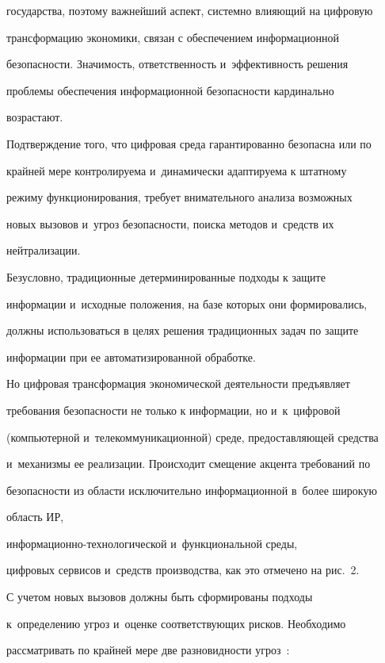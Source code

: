 государства, поэтому важнейший аспект, системно влияющий на цифровую 

трансформацию экономики, связан с обеспечением информационной 

безопасности. Значимость, ответственность и~эффективность решения 

проблемы обеспечения информационной безопасности кардинально 

возрастают.

  

  Подтверждение того, что цифровая среда гарантированно безопасна или по 

крайней мере контролируема и~динамически адаптируема к штатному 

режиму функционирования, требует внимательного анализа возможных 

новых вызовов и~угроз безопасности, поиска методов и~средств их 

нейтрализации. 

  

  Безусловно, традиционные детерминированные подходы к защите 

информации и~исходные положения, на базе которых они формировались, 

должны использоваться в целях решения традиционных задач по защите 

информации при ее автоматизированной обработке. 

  

  Но цифровая трансформация экономической деятельности предъявляет 

требования безопасности не только к информации, но и~к~цифровой 

(компьютерной и~телекоммуникационной) среде, предоставляющей средства 

и~механизмы ее реализации. Происходит смещение акцента требований по 

безопасности из области исключительно информационной в~более широкую 

область ИР,  

ин\-фор\-ма\-ци\-он\-но-тех\-но\-ло\-ги\-че\-ской и~функциональной среды, 

цифровых сервисов и~средств производства, как это отмечено на рис.~2.

  

  С учетом новых вызовов должны быть сформированы подходы 

к~определению угроз и~оценке соответствующих рисков. Необходимо 

рассматривать по крайней мере две разновидности угроз~\cite{3-zk}: 

